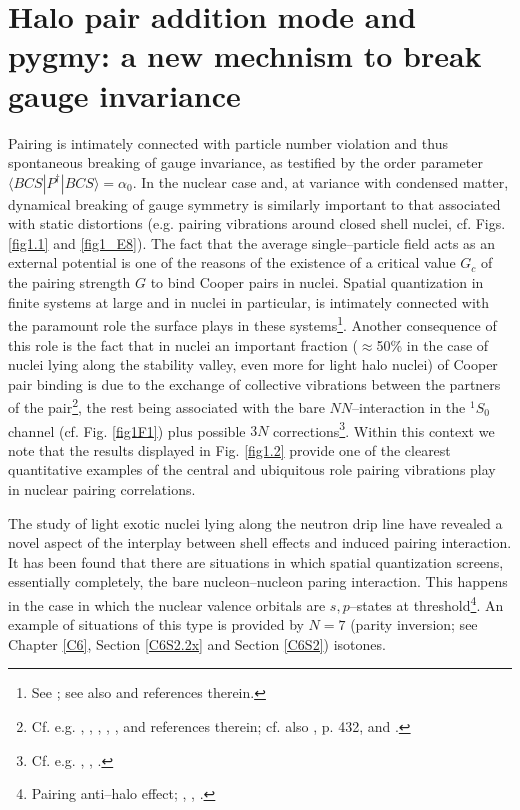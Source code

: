 \section[Halo pair addition mode and pygmy]{Halo pair addition mode and pygmy: a new mechnism to break gauge invariance}\label{App1AF}
Pairing is intimately connected with particle number violation and thus spontaneous breaking of gauge invariance, as testified by the order parameter\\ \mbox{$\langle BCS|P^{\dagger}|BCS\rangle=\alpha_0$}.  In the nuclear case and, at variance with condensed matter, dynamical breaking of gauge symmetry is similarly important to that associated with static distortions (e.g. pairing vibrations around closed shell nuclei, cf. Figs. \ref{fig1.1} and \ref{fig1_E8}). The fact that the average single--particle field acts as an external potential  is one of the reasons of the existence of a critical value $G_c$ of the pairing strength $G$ to bind Cooper pairs in nuclei. Spatial quantization in finite systems at large and in nuclei in particular, is intimately connected with the paramount role the surface plays in these systems\footnote{See \cite{Bohr:75}; see also \cite{Broglia:02d} and references therein.}. Another consequence of this role is  the fact that in nuclei an important fraction ($\approx$50\% in the case of nuclei lying along the stability valley, even more for light halo nuclei) of Cooper pair binding is due to the exchange of collective vibrations between the partners of the pair\footnote{Cf. e.g. \cite{Barranco:99}, \cite{Brink:05}, \cite{Saperstein:12}, \cite{Avdenkov:12}, \cite{Lombardo:12}, and references therein; cf. also \cite{Bohr:75}, p. 432, \cite{Barranco:01} and \cite{Potel:10}.}, the rest being associated with the bare $NN$--interaction in the $^1S_0$ channel (cf. Fig. \ref{fig1F1}) plus possible $3N$ corrections\footnote{Cf. e.g. \cite{Lesinski:12}, \cite{Pankratov:11}, \cite{Hergert:09}.}. Within this context we note that the results displayed in Fig. \ref{fig1.2} provide one of the clearest quantitative examples of the central and ubiquitous role pairing vibrations play in nuclear pairing correlations.


The study of light exotic nuclei lying along the neutron drip line have revealed a novel aspect of the interplay between shell effects and induced pairing interaction. It has been found  that there are situations in which spatial quantization screens, essentially completely, the bare nucleon--nucleon paring interaction. This happens in the case in which the nuclear valence orbitals are $s,p$--states at threshold\footnote{Pairing anti--halo effect; \cite{Bennaceur:00} 
, \cite{Hamamoto:03}, \cite{Hamamoto:04}.}. An example of situations of this type is provided by $N=7$ (parity inversion; see Chapter \ref{C6}, Section \ref{C6S2.2x} and Section \ref{C6S2}) isotones.


